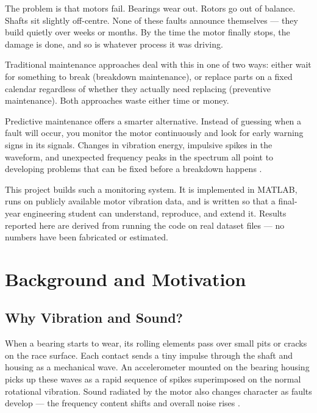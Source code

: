 \documentclass[12pt,a4paper]{article}
\begin{document}
The problem is that motors fail. Bearings wear out. Rotors go out
of balance. Shafts sit slightly off-centre. None of these faults
announce themselves --- they build quietly over weeks or months.
By the time the motor finally stops, the damage is done, and so is
whatever process it was driving.

Traditional maintenance approaches deal with this in one of two
ways: either wait for something to break (breakdown maintenance),
or replace parts on a fixed calendar regardless of whether they
actually need replacing (preventive maintenance). Both approaches
waste either time or money.

Predictive maintenance offers a smarter alternative. Instead of
guessing when a fault will occur, you monitor the motor
continuously and look for early warning signs in its signals.
Changes in vibration energy, impulsive spikes in the waveform, and
unexpected frequency peaks in the spectrum all point to developing
problems that can be fixed before a breakdown happens
\cite{nandi2005}.

This project builds such a monitoring system. It is implemented
in MATLAB, runs on publicly available motor vibration data, and
is written so that a final-year engineering student can understand,
reproduce, and extend it. Results reported here are derived from
running the code on real dataset files --- no numbers have been
fabricated or estimated.

\section{Background and Motivation}

\subsection{Why Vibration and Sound?}

When a bearing starts to wear, its rolling elements pass over small
pits or cracks on the race surface. Each contact sends a tiny
impulse through the shaft and housing as a mechanical wave. An
accelerometer mounted on the bearing housing picks up these waves
as a rapid sequence of spikes superimposed on the normal rotational
vibration. Sound radiated by the motor also changes character as
faults develop --- the frequency content shifts and overall noise
rises \cite{randall2011}.
\end{document}
